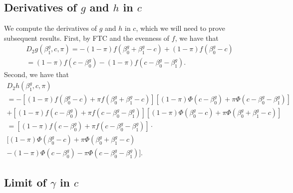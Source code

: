 \documentclass[12pt]{article}
\begin{document}
\begin{appendices}
\subsection{Derivatives of  $g$ and $h$ in $c$}\label{sec:derivatives}
We compute the derivatives of $g$ and $h$ in $c$, which we will need to prove subsequent results. First, by FTC and the evenness of $f$, we have that
\begin{multline}\label{dg_dc}
D_2 g(\beta^g_1, c, \pi) = -(1-\pi)f( \beta^g_0 + \beta^g_1 - c ) + (1-\pi) f(\beta^g_0 - c) \\ = (1-\pi) f(c - \beta^g_0) - (1-\pi)f(c - \beta^g_0 - \beta^g_1).
\end{multline}
Second, we have that
\begin{multline}\label{dh_dc}
D_2 h(\beta^g_1, c, \pi) \\ = -[(1-\pi)f(\beta^g_0 - c) + \pi f( \beta^g_0 + \beta^g_1 - c )]\left[(1-\pi)\Phi(c - \beta^g_0) + \pi \Phi(c - \beta_0^g - \beta_1^g)  \right] \\ + [(1-\pi) f(c - \beta^g_0) +  \pi f(c - \beta^g_0 - \beta^g_1)] \left[(1-\pi) \Phi(\beta_0^g - c) + \pi \Phi(\beta^g_0 + \beta^g_1 - c) \right] \\ = \left[ (1-\pi) f(c - \beta^g_0) +  \pi f(c - \beta^g_0 - \beta^g_1) \right] \cdot \\ \bigg[ (1-\pi) \Phi(\beta_0^g - c) + \pi\Phi(\beta^g_0 + \beta^g_1 - c) \\ - (1-\pi) \Phi(c - \beta^g_0) - \pi \Phi(c - \beta_0^g - \beta_1^g) \bigg].
\end{multline}

\subsection{Limit of $\gamma$ in $c$}\label{sec:c_limit}


\end{appendices}
\end{document}
